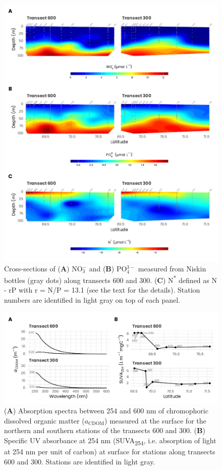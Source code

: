 \documentclass[essd, manuscript]{copernicus}
\begin{document}
\clearpage

\begin{figure}[H]
    \centering
    \includegraphics[scale = 0.85]{../../../graphs/fig06.pdf}
    \caption{Cross-sections of (\textbf{A}) NO$_3^-$ and (\textbf{B}) PO$_4^{3-}$ measured from Niskin bottles (gray dots) along transects 600 and 300. (\textbf{C}) N\textsuperscript{*} defined as N - rP with r = N/P = 13.1 (see the text for the details). Station numbers are identified in light gray on top of each panel.}
\end{figure}

\clearpage

\begin{figure}[H]
    \centering
    \includegraphics[scale = 1]{../../../graphs/fig07.pdf}
    \caption{(\textbf{A}) Absorption spectra between 254 and 600 nm of chromophoric dissolved organic matter ($a_{\text{CDOM}}$) measured at the surface for the northern and southern stations of the transects 600 and 300. (\textbf{B}) Specific UV absorbance at 254 nm (SUVA\textsubscript{254}, i.e. absorption of light at 254 nm per unit of carbon) at surface for stations along transects 600 and 300. Stations are identified in light gray.}
\end{figure}
\end{document}
